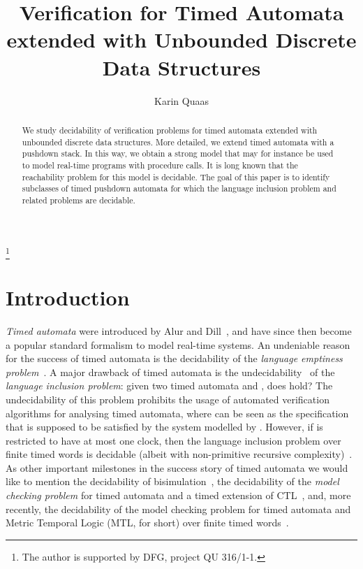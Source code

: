 \documentclass{CSML}
\theoremstyle{plain}\newtheorem{theorem}[thm]{Theorem}
\theoremstyle{plain}\newtheorem{corollary}[thm]{Corollary}
\theoremstyle{plain}\newtheorem{example}[thm]{Example}
\theoremstyle{plain}\newtheorem{lemma}[thm]{Lemma}
\theoremstyle{plain}\newtheorem{remark}[thm]{Remark}
\begin{document}
	\title[Timed Automata with Unbounded Discrete Data Structures]{Verification for Timed Automata extended with Unbounded Discrete Data Structures}

\author[K.~Quaas]{Karin Quaas}	\address{Universit\"at Leipzig, Germany}	
\thanks{The author is supported by DFG, project QU 316/1-1.}	














\begin{abstract}
  \noindent We study decidability of verification problems for timed automata extended with unbounded discrete data structures. 
	More detailed, we extend timed automata with a pushdown stack. 
	In this way, we obtain a strong model that may for instance be used to model real-time programs with procedure calls. 
	It is long known that the reachability problem for this model is decidable. 
	The goal of this paper is to identify subclasses of timed pushdown automata for which the language inclusion problem and related problems are decidable.
\end{abstract}

\maketitle

\section{Introduction}
\emph{Timed automata} were introduced by Alur and Dill~\cite{AD94}, and have since then become a popular standard formalism to model real-time systems. 
An undeniable reason for the success of timed automata is the  decidability of the \emph{language emptiness problem}~\cite{AD94}.
A major drawback of timed automata is the undecidability~\cite{AD94} of the \emph{language inclusion problem}: given two timed automata  and , does  hold?
The undecidability of this problem prohibits the usage of automated verification algorithms for analysing timed automata, where  can be seen as the specification that is supposed to be satisfied by the system modelled by . 
However, if  is restricted to have at most one clock, then the language inclusion problem over finite timed words is decidable (albeit with non-primitive recursive complexity)~\cite{DBLP:conf/lics/OuaknineW04}.
As other important milestones in the success story of timed automata we would like to mention the decidability of bisimulation~\cite{DBLP:conf/cav/Cerans92}, 
the decidability of the \emph{model checking problem} for timed automata and a timed extension of CTL~\cite{DBLP:conf/lics/HenzingerNSY92}, and, more recently,  the decidability of the model checking problem for timed automata and Metric Temporal Logic (MTL, for short) over finite timed words~\cite{DBLP:conf/lics/OuaknineW05}.
\end{document}
